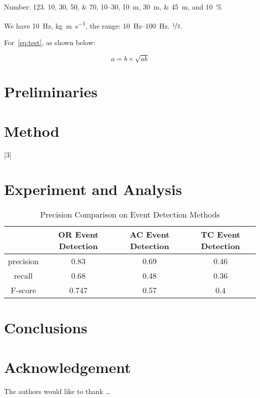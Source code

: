 Number:
\num{123}.
\numlist{10;30;50;70},
\numrange{10}{30},
\SIlist{10;30;45}{\metre},
and
\SI{10}{\percent}



\begin{ConferenceOnly}
We have \SI{10}{\hertz},
\si{\kilogram\metre\per\second},
the range: \SIrange{10}{100}{\hertz}.
$\nicefrac[]{1}{2}$.


\end{ConferenceOnly}


For~\cref{eq:test},
as shown below:

\begin{equation}\label{eq:test}
a = b \times \sqrt{ab}
\end{equation}

\blindmathpaper

\section{Preliminaries} \label{sec-preliminaries}

\blindtext

\gliMarker  %


\section{Method} \label{sec-method}

\blindtext
{}[3]
\blinditemize
\blindenumerate

\blindmathtrue
\blindmathfalse
\blinddescription

\qwuMarker %

\section{Experiment and Analysis} \label{sec-experiment}


\begin{table}  \centering
  \caption{Precision Comparison on Event Detection Methods}
  \label{tbl:overall-experiments}
  \begin{tabular}{cccc}
\toprule
    & OR Event Detection & AC Event Detection & TC Event Detection \\
\midrule
    precision & 0.83 & 0.69 & 0.46 \\
    recall & 0.68 & 0.48 & 0.36 \\
    F-score & 0.747 & 0.57 & 0.4 \\
\bottomrule
\end{tabular}
\end{table}


\section{Conclusions} \label{sec-conclusions}

\blindtext

\section*{Acknowledgement}

\lipsum[1]


The authors would like to thank \ldots

